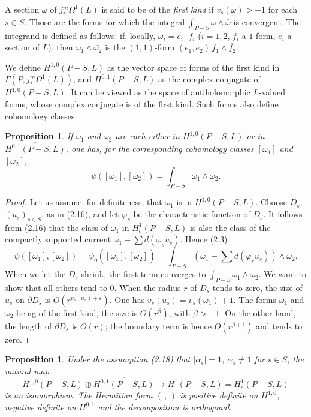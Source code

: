 \documentclass[12pt,a4paper]{article}
\theoremstyle{plain}
\newtheorem{proposition}[theorem]{Proposition}
\theoremstyle{definition}
\theoremstyle{remark}
\numberwithin{equation}{section}
\begin{document}
A section $\omega$ of $j_*^m \Omega^1(L)$ is said to be of the \emph{first kind} if $v_s(\omega) > -1$ for each $s \in S$. Those are the forms for which the integral $\int_{P-S} \omega \wedge \overline{\omega}$ is convergent. The integrand is defined as follows: if, locally, $\omega_i = e_i \cdot f_i$ ($i = 1, 2$, $f_i$ a $1$-form, $e_i$ a section of $L$), then $\omega_1 \wedge \overline{\omega_2}$ is the $(1,1)$-form $(e_1, e_2) \, f_1 \wedge \overline{f_2}$.

We define $H^{1,0}(P-S, L)$ as the vector space of forms of the first kind in $\Gamma(P, j_*^m \Omega^1(L))$, and $H^{0,1}(P-S, L)$ as the complex conjugate of $H^{1,0}(P-S, L)$. It can be viewed as the space of antiholomorphic $L$-valued forms, whose complex conjugate is of the first kind. Such forms also define cohomology classes.

\begin{proposition}\label{prop:2.19}
If $\omega_1$ and $\omega_2$ are each either in $H^{1,0}(P-S, L)$ or in $\overline{H^{0,1}(P-S, L)}$, one has, for the corresponding cohomology classes $[\omega_1]$ and $[\omega_2]$,
\[
\psi([\omega_1], [\omega_2]) = \int_{P-S} \omega_1 \wedge \omega_2.
\]
\end{proposition}

\begin{proof}
Let us assume, for definiteness, that $\omega_1$ is in $H^{1,0}(P-S, L)$. Choose $D_s$, $(u_s)_{s \in S}$, as in (2.16), and let $\varphi_s$ be the characteristic function of $D_s$. It follows from (2.16) that the class of $\omega_1$ in $H^1_c(P-S, L)$ is also the class of the compactly supported current $\omega_1 - \sum d(\varphi_s u_s)$. Hence (2.3)
\[
\psi([\omega_1], [\omega_2]) = \psi_0([\omega_1], \overline{[\omega_2]}) = \int_{P-S} (\omega_1 - \sum d(\varphi_s u_s)) \wedge \omega_2.
\]
When we let the $D_s$ shrink, the first term converges to $\int_{P-S} \omega_1 \wedge \omega_2$. We want to show that all others tend to $0$. When the radius $r$ of $D_s$ tends to zero, the size of $u_s$ on $\partial D_s$ is $O(r^{v_s(u_s)+\varepsilon})$. One has $v_s(u_s) = v_s(\omega_1)+1$. The forms $\omega_1$ and $\omega_2$ being of the first kind, the size is $O(r^\beta)$, with $\beta > -1$. On the other hand, the length of $\partial D_s$ is $O(r)$; the boundary term is hence $O(r^{\beta+1})$ and tends to zero.
\end{proof}

\begin{proposition}\label{prop:2.20}
Under the assumption (2.18) that $|\alpha_s| = 1$, $\alpha_s \neq 1$ for $s \in S$, the natural map
\[
H^{1,0}(P-S, L) \oplus \overline{H^{0,1}(P-S, L)} \to H^1(P-S, L) = H^1_c(P-S, L)
\]
is an isomorphism. The Hermitian form $(\,,\,)$ is positive definite on $H^{1,0}$, negative definite on $H^{0,1}$ and the decomposition is orthogonal.
\end{proposition}
\end{document}
